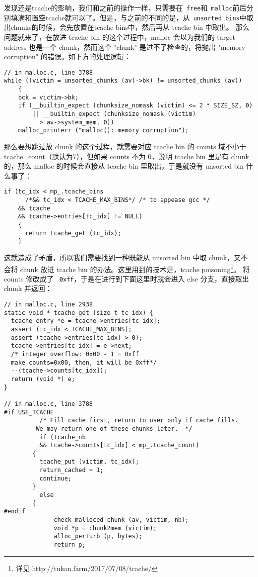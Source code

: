 发现还是tcache的影响，我们和之前的操作一样，只需要在\verb+ free+和\verb+ malloc+前后分别填满和置空tcache就可以了。但是，与之前的不同的是，从\verb+ unsorted bins+中取出chunks的时候，会先放置在tcache bins中，然后再从 tcache bin 中取出。
那么问题就来了，在放进 tcache bin 的这个过程中，malloc 会以为我们的 target address 也是一个 chunk，然而这个 "chunk" 是过不了检查的，将抛出 "memory corruption" 的错误。如下方的处理逻辑：

\begin{verbatim}
// in malloc.c, line 3788
while ((victim = unsorted_chunks (av)->bk) != unsorted_chunks (av))
    {
    bck = victim->bk;
    if (__builtin_expect (chunksize_nomask (victim) <= 2 * SIZE_SZ, 0)
        || __builtin_expect (chunksize_nomask (victim)
	      > av->system_mem, 0))
    malloc_printerr ("malloc(): memory corruption");
\end{verbatim}

那么要想跳过放 chunk 的这个过程，就需要对应 tcache bin 的 counts 域不小于 tcache\_count（默认为7），但如果 counts 不为 0，说明 tcache bin 里是有 chunk 的，那么 malloc 的时候会直接从 tcache bin 里取出，于是就没有 unsorted bin 什么事了：

\begin{verbatim}
if (tc_idx < mp_.tcache_bins
      /*&& tc_idx < TCACHE_MAX_BINS*/ /* to appease gcc */
    && tcache
    && tcache->entries[tc_idx] != NULL)
    {
      return tcache_get (tc_idx);
    }
\end{verbatim}

这就造成了矛盾，所以我们需要找到一种既能从 unsorted bin 中取 chunk，又不会将 chunk 放进 tcache bin 的办法。这里用到的技术是，tcache poisoning\footnote{详见 http://tukan.farm/2017/07/08/tcache/}。
将 counts 修改成了 \verb+ 0xff+，于是在进行到下面这里时就会进入 else 分支，直接取出 chunk 并返回：

\begin{verbatim}
// in malloc.c, line 2938
static void * tcache_get (size_t tc_idx) {
  tcache_entry *e = tcache->entries[tc_idx];
  assert (tc_idx < TCACHE_MAX_BINS);
  assert (tcache->entries[tc_idx] > 0);
  tcache->entries[tc_idx] = e->next;
  /* integer overflow: 0x00 - 1 = 0xff 
  make counts=0x00, then, it will be 0xff*/
  --(tcache->counts[tc_idx]);  
  return (void *) e;
}

// in malloc.c, line 3788
#if USE_TCACHE
          /* Fill cache first, return to user only if cache fills.
         We may return one of these chunks later.  */
          if (tcache_nb
          && tcache->counts[tc_idx] < mp_.tcache_count)
        {
          tcache_put (victim, tc_idx);
          return_cached = 1;
          continue;
        }
          else
        {
#endif
              check_malloced_chunk (av, victim, nb);
              void *p = chunk2mem (victim);
              alloc_perturb (p, bytes);
              return p;
\end{verbatim}

